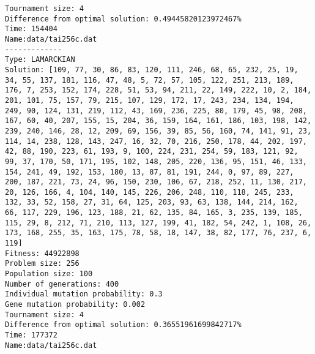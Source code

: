 \begin{lstlisting}
Tournament size: 4
Difference from optimal solution: 0.49445820123972467%
Time: 154404
Name:data/tai256c.dat
-------------
Type: LAMARCKIAN
Solution: [109, 77, 30, 86, 83, 120, 111, 246, 68, 65, 232, 25, 19, 34, 55, 137, 181, 116, 47, 48, 5, 72, 57, 105, 122, 251, 213, 189, 176, 7, 253, 152, 174, 228, 51, 53, 94, 211, 22, 149, 222, 10, 2, 184, 201, 101, 75, 157, 79, 215, 107, 129, 172, 17, 243, 234, 134, 194, 249, 90, 124, 131, 219, 112, 43, 169, 236, 225, 80, 179, 45, 98, 208, 167, 60, 40, 207, 155, 15, 204, 36, 159, 164, 161, 186, 103, 198, 142, 239, 240, 146, 28, 12, 209, 69, 156, 39, 85, 56, 160, 74, 141, 91, 23, 114, 14, 238, 128, 143, 247, 16, 32, 70, 216, 250, 178, 44, 202, 197, 42, 88, 190, 223, 61, 193, 9, 100, 224, 231, 254, 59, 183, 121, 92, 99, 37, 170, 50, 171, 195, 102, 148, 205, 220, 136, 95, 151, 46, 133, 154, 241, 49, 192, 153, 180, 13, 87, 81, 191, 244, 0, 97, 89, 227, 200, 187, 221, 73, 24, 96, 150, 230, 106, 67, 218, 252, 11, 130, 217, 20, 126, 166, 4, 104, 140, 145, 226, 206, 248, 110, 118, 245, 233, 132, 33, 52, 158, 27, 31, 64, 125, 203, 93, 63, 138, 144, 214, 162, 66, 117, 229, 196, 123, 188, 21, 62, 135, 84, 165, 3, 235, 139, 185, 115, 29, 8, 212, 71, 210, 113, 127, 199, 41, 182, 54, 242, 1, 108, 26, 173, 168, 255, 35, 163, 175, 78, 58, 18, 147, 38, 82, 177, 76, 237, 6, 119]
Fitness: 44922898
Problem size: 256
Population size: 100
Number of generations: 400
Individual mutation probability: 0.3
Gene mutation probability: 0.002
Tournament size: 4
Difference from optimal solution: 0.36551961699842717%
Time: 177372
Name:data/tai256c.dat
\end{lstlisting}


